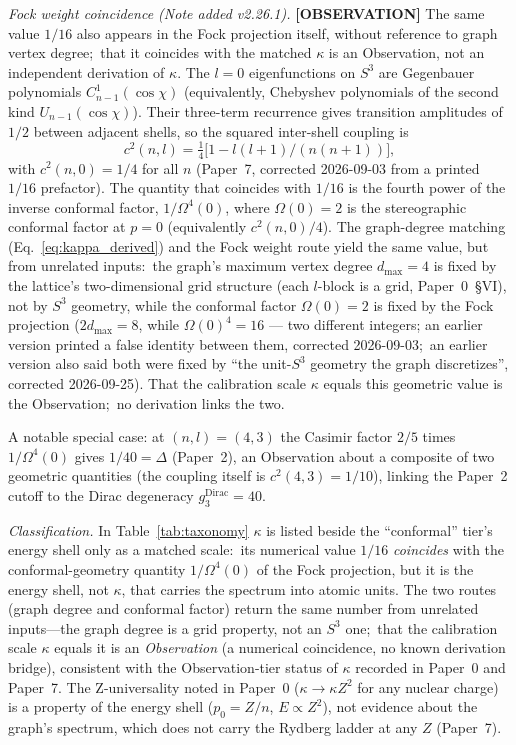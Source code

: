 \documentclass[aps,pra,twocolumn,superscriptaddress,longbibliography]{revtex4-2}
\begin{document}
\textit{Fock weight coincidence (Note added v2.26.1).}
\textbf{[OBSERVATION]} The same value $1/16$ also appears in the Fock
projection itself, without reference to graph vertex degree;\ that it
coincides with the matched $\kappa$ is an Observation, not an
independent derivation of $\kappa$.  The $l = 0$ eigenfunctions on $S^3$
are Gegenbauer polynomials $C^1_{n-1}(\cos\chi)$ (equivalently,
Chebyshev polynomials of the second kind $U_{n-1}(\cos\chi)$).  Their
three-term recurrence gives transition amplitudes of $1/2$ between
adjacent shells, so the squared inter-shell coupling is
\begin{equation}
  c^2(n,l) = \tfrac{1}{4}\bigl[1 - l(l{+}1)/(n(n{+}1))\bigr],
  \label{eq:fock_coupling_p18}
\end{equation}
with $c^2(n,0) = 1/4$ for all $n$ (Paper~7, corrected 2026-09-03 from a
printed $1/16$ prefactor).  The quantity that coincides with $1/16$ is
the fourth power of the inverse conformal factor, $1/\Omega^4(0)$, where $\Omega(0) = 2$ is the
stereographic conformal factor at $p = 0$ (equivalently $c^2(n,0)/4$).  The graph-degree matching
(Eq.~\ref{eq:kappa_derived}) and the Fock weight route yield the same
value, but from unrelated inputs:\ the graph's maximum vertex degree
$d_{\max} = 4$ is fixed by the lattice's two-dimensional grid structure
(each $l$-block is a grid, Paper~0~\S VI), not by $S^3$ geometry, while
the conformal factor $\Omega(0) = 2$ is fixed by the Fock projection
($2 d_{\max} = 8$, while $\Omega(0)^4 = 16$ --- two different integers;
an earlier version printed a false identity between them, corrected
2026-09-03;\ an earlier version also said both were fixed by ``the
unit-$S^3$ geometry the graph discretizes'', corrected 2026-09-25).
That the calibration scale $\kappa$ equals this geometric value is the
Observation;\ no derivation links the two.

A notable special case: at $(n,l) = (4,3)$ the Casimir factor $2/5$
times $1/\Omega^4(0)$ gives $1/40 = \Delta$ (Paper~2), an Observation
about a composite of two geometric quantities (the coupling itself is
$c^2(4,3) = 1/10$), linking the Paper~2 cutoff to the Dirac degeneracy
$g_3^{\mathrm{Dirac}} = 40$.

\textit{Classification.}  In Table~\ref{tab:taxonomy} $\kappa$ is
listed beside the ``conformal'' tier's energy shell only as a matched
scale:\ its numerical value $1/16$ \emph{coincides} with the
conformal-geometry quantity $1/\Omega^4(0)$ of the Fock projection, but
it is the energy shell, not $\kappa$, that carries the spectrum into
atomic units.  The two routes (graph degree and conformal factor)
return the same number from unrelated inputs---the graph degree is a
grid property, not an $S^3$ one;\ that the
calibration scale $\kappa$ equals it is an \emph{Observation} (a
numerical coincidence, no known derivation bridge), consistent with the
Observation-tier status of $\kappa$ recorded in Paper~0 and Paper~7.  The Z-universality noted in
Paper~0 ($\kappa \to \kappa Z^2$ for any nuclear charge) is a
property of the energy shell ($p_0 = Z/n$, $E \propto Z^2$), not
evidence about the graph's spectrum, which does not carry the Rydberg
ladder at any $Z$ (Paper~7).
\end{document}
